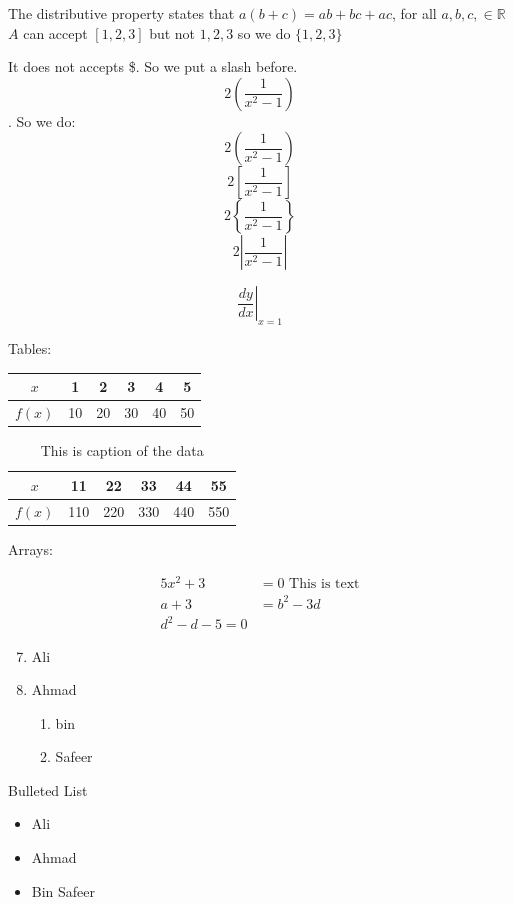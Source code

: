 \documentclass[]{article}
\begin{document}
	
	The distributive property states that $a (b+c) = ab + bc + ac$, for all $a, b, c, \in \mathbb{R}$ \\[6pt]
	$A$ can accept $[1, 2, 3]$ but not ${1, 2, 3}$ so we do $\{1, 2, 3\}$
	
	It does not accepts \$. So we put a slash before.\\[6pt]
	 
	 $$2(\frac{1}{x^2 - 1})$$. So we do: 
	 $$2\left (\frac{1}{x^2 - 1}\right) $$
	$$2\left [\frac{1}{x^2 - 1}\right ] $$ $$2\left \{\frac{1}{x^2 - 1}\right \} $$ $$2\left | \frac{1}{x^2 - 1}\right | $$
	
	$$\left.\frac{dy}{dx}\right|_{x=1} $$
	
	Tables: 
	
	\begin{tabular}{|c||c|c|c|c|c|} \hline
		$x$ & 1 & 2 & 3 & 4 & 5 \\ \hline
		$f(x)$ & 10 & 20 & 30 & 40 & 50 \\ \hline
	\end{tabular}
	
	\vspace{0.66cm}
	\begin{table}[H] 
	\centering %
	
	\def \arraystretch{1}
	\begin{tabular}{|c||c|c|c|c|c|} \hline
		$x$ & 11 & 22 & 33 & 44 & 55 \\ \hline
		$f(x)$ & 110 & 220 & 330 & 440 & 550 \\ \hline
	\end{tabular}
	\caption{This is caption of the data }
	\end{table}
	
	
	
	Arrays: 
	
	\begin{align}
		5x^2+3 &= 0 \text{ This is text}\\ 
		a+3 &= b^2-3d \\
		d^2-d-5 = 0
	\end{align}
	
	\begin{enumerate} \setcounter{enumi}{6}
		\item Ali
		\item Ahmad
		\begin{enumerate}
			\item bin
			\item Safeer
		\end{enumerate}
	\end{enumerate}
	Bulleted List
		\begin{itemize}
		\item Ali
		\item Ahmad
		\item Bin Safeer
	\end{itemize}
	
\end{document}
